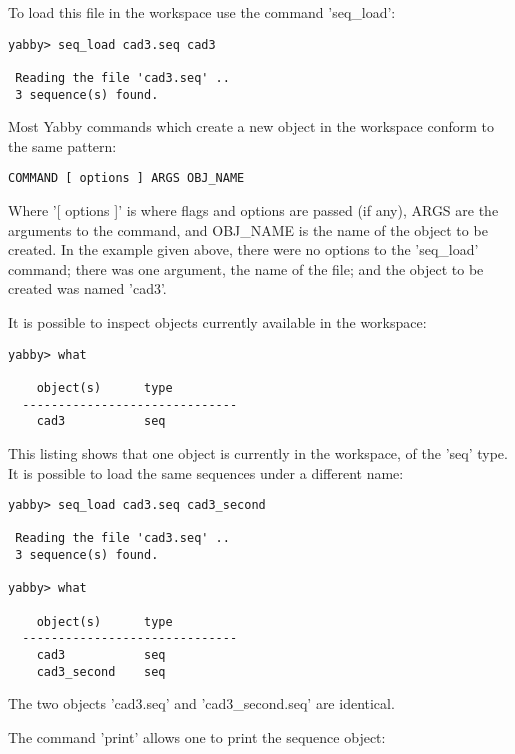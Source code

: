 
To load this file in the workspace use the command 'seq\_load':

\begin{verbatim}
yabby> seq_load cad3.seq cad3

 Reading the file 'cad3.seq' ..
 3 sequence(s) found.

\end{verbatim}

Most Yabby commands which create a new object in the workspace
conform to the same pattern:

\begin{verbatim}
COMMAND [ options ] ARGS OBJ_NAME
\end{verbatim}

Where '[ options ]' is where flags and options are passed (if
any), ARGS are the arguments to the command, and OBJ\_NAME is
the name of the object to be created. In the example given
above, there were no options to the 'seq\_load' command; there
was one argument, the name of the file; and the object to be
created was named 'cad3'.

It is possible to inspect objects currently available in the
workspace:


\begin{verbatim}
yabby> what

    object(s)      type
  ------------------------------
    cad3           seq           

\end{verbatim}

This listing shows that one object is currently in the workspace,
of the 'seq' type. It is possible to load the same sequences
under a different name: 

\begin{verbatim}
yabby> seq_load cad3.seq cad3_second

 Reading the file 'cad3.seq' ..
 3 sequence(s) found.

yabby> what

    object(s)      type
  ------------------------------
    cad3           seq           
    cad3_second    seq           

\end{verbatim}

The two objects 'cad3.seq' and 'cad3\_second.seq' are identical.


The command 'print' allows one to print the sequence object:

